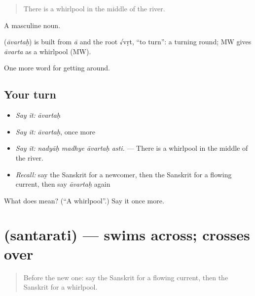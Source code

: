 \begin{quote}
There is a whirlpool in the middle of the river.
\end{quote}

A masculine noun.

\begin{cousinweb}
\textbf{} (\emph{āvartaḥ}) is built from \emph{ā} and the root √vṛt, \textquotedblleft{}to turn\textquotedblright{}: a turning round; MW gives \emph{āvarta} as a whirlpool (MW).
\end{cousinweb}

\begin{grammarlens}[title={What you've built}]
One more word for getting around.
\end{grammarlens}

\subsection*{Your turn}
\begin{itemize}
\raggedright
  \item \emph{Say it:} \emph{āvartaḥ}
  \item \emph{Say it:} \emph{āvartaḥ}, once more
  \item \emph{Say it:} \emph{nadyāḥ madhye āvartaḥ asti.} — There is a whirlpool in the middle of the river.
  \item \emph{Recall:} say the Sanskrit for a newcomer, then the Sanskrit for a flowing current, then say \emph{āvartaḥ} again
\end{itemize}

\begin{tcolorbox}[breakable,colback=teal!4,colframe=teal!35!black,title={Before you move on}]
What does  mean? (\textquotedblleft{}A whirlpool\textquotedblright{}.) Say it once more.
\end{tcolorbox}
\section[\texorpdfstring{\sk{सन्तरति} (santarati)}{सन्तरति (santarati)}]{ (santarati) — swims across; crosses over}

\label{lesson:SA-C415-santarati}



\begin{quote}
Before the new one: say the Sanskrit for a flowing current, then the Sanskrit for a whirlpool.
\end{quote}

